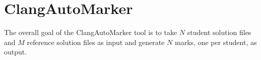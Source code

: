 \chapter{ClangAutoMarker}
\label{chap:clangautomarker}

The overall goal of the ClangAutoMarker tool is to take $N$ student solution files and $M$ reference solution files as input and generate $N$ marks, one per student, as output.





